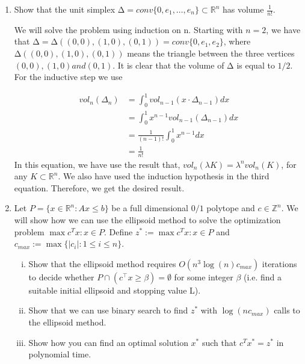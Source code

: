\documentclass[11pt]{article}
\institute{\'Ecole Polytechnique F\'ed\'erale de Lausanne}
\newcommand{\setR}{\mathbb{R}}
\newcommand{\setZ}{\mathbb{Z}}
\begin{document}
\makeheader

\begin{enumerate}[1)]

\item Show that the unit simplex $∆ = conv\{0,e_1,\hdots,e_n\}⊂\setR^n$ has volume $\frac{1}{n!}$.


\begin{solution}
We will solve the problem using induction on n. Starting with $n = 2$, we have that $∆ =
∆((0,0),(1,0),(0,1)) = conv \{0,e_1,e_2\}$, where $∆((0,0),(1,0),(0,1))$ means the triangle between
the three vertices $(0,0),(1,0) and (0,1)$. It is clear that the volume of $∆$ is equal to $1/2$.
For the inductive step we use

\begin{align*}
vol_n(\Delta_n) & = \int_0^1 vol_{n-1}(x\cdot \Delta_{n-1}) dx \\
& = \int_0^1 x^{n-1}vol_{n-1}(\Delta_{n-1}) dx \\
& = \frac{1}{(n-1)!}\int_0^1 x^{n-1}dx \\
& = \frac{1}{n!}
\end{align*}
In this equation, we have use the result that, $vol_n(λK) = λ^nvol_n(K)$, for any $K ⊂\setR^n$. We also
have used the induction hypothesis in the third equation. Therefore, we get the desired result.

\end{solution}



\item Let $P= \{x∈\setR^n : Ax≤b\}$ be a full dimensional $0/1$ polytope and $c ∈\setZ^n$. We will show how we
can use the ellipsoid method to solve the optimization problem $\max c^Tx: x∈P$.
Define $z^*:= \max c^Tx: x∈P$ and $c_{max} := \max \{|c_i|: 1 ≤i≤n\}$.
\begin{enumerate}[i)]
\item Show that the ellipsoid method requires $O(n^3 \log(n)c_{max})$ iterations to decide whether $P ∩
(c^⊤x≥β) = ∅$ for some integer $β$ (i.e. find a suitable initial ellipsoid and stopping value L).
\item Show that we can use binary search to find $z^*$ with $\log(nc_{max})$ calls to the ellipsoid method.
\item Show how you can find an optimal solution $x^*$ such that $c^Tx^*= z^*$ in polynomial time.
\end{enumerate}



\end{enumerate}
\end{document}
